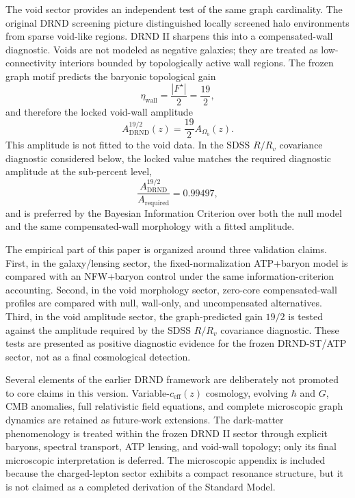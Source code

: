 \documentclass[12pt]{iopart}
\begin{document}
The void sector provides an independent test of the same graph cardinality. The original DRND screening picture distinguished locally screened halo environments from sparse void-like regions. DRND II sharpens this into a compensated-wall diagnostic. Voids are not modeled as negative galaxies; they are treated as low-connectivity interiors bounded by topologically active wall regions. The frozen graph motif predicts the baryonic topological gain
\begin{equation}
\eta_{\mathrm{wall}}
=
\frac{|F^\star|}{2}
=
\frac{19}{2},
\end{equation}
and therefore the locked void-wall amplitude
\begin{equation}
A_{\mathrm{DRND}}^{19/2}(z)
=
\frac{19}{2}A_{\Omega_b}(z).
\end{equation}
This amplitude is not fitted to the void data. In the SDSS $R/R_v$ covariance diagnostic considered below, the locked value matches the required diagnostic amplitude at the sub-percent level,
\begin{equation}
\frac{A_{\mathrm{DRND}}^{19/2}}{A_{\mathrm{required}}}=0.99497,
\end{equation}
and is preferred by the Bayesian Information Criterion over both the null model and the same compensated-wall morphology with a fitted amplitude.

The empirical part of this paper is organized around three validation claims. First, in the galaxy/lensing sector, the fixed-normalization ATP+baryon model is compared with an NFW+baryon control under the same information-criterion accounting. Second, in the void morphology sector, zero-core compensated-wall profiles are compared with null, wall-only, and uncompensated alternatives. Third, in the void amplitude sector, the graph-predicted gain \(19/2\) is tested against the amplitude required by the SDSS \(R/R_v\) covariance diagnostic. These tests are presented as positive diagnostic evidence for the frozen DRND-ST/ATP sector, not as a final cosmological detection.

Several elements of the earlier DRND framework are deliberately not promoted to core claims in this version. 
Variable-\(c_{\mathrm{eff}}(z)\) cosmology, evolving \(\hbar\) and \(G\), CMB anomalies, full relativistic field equations, and complete microscopic graph dynamics are retained as future-work extensions. The dark-matter phenomenology is treated within the frozen DRND II sector through explicit baryons, spectral transport, ATP lensing, and void-wall topology; only its final microscopic interpretation is deferred. The microscopic appendix is included because the charged-lepton sector exhibits a compact resonance structure, but it is not claimed as a completed derivation of the Standard Model.
\end{document}
